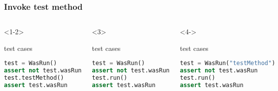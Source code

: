 \documentclass[lualatex]{beamer}
\begin{document}
\begin{frame}[fragile,t]
    \frametitle{Invoke test method}

    \begin{columns}[t]
        \small
        \begin{onlyenv}<1-2>
            \begin{block}{test cases}
                \begin{lstlisting}[language=Python,columns=fullflexible]
test = WasRun()
assert not test.wasRun
test.testMethod()
assert test.wasRun
                \end{lstlisting}
            \end{block}
        \end{onlyenv}

        \begin{onlyenv}<3>
            \begin{block}{test cases}
                \begin{lstlisting}[language=Python,columns=fullflexible]
test = WasRun()
assert not test.wasRun
test.run()
assert test.wasRun
                \end{lstlisting}
            \end{block}
        \end{onlyenv}

        \begin{onlyenv}<4->
            \begin{block}{test cases}
                \begin{lstlisting}[language=Python,columns=fullflexible]
test = WasRun("testMethod")
assert not test.wasRun
test.run()
assert test.wasRun
                \end{lstlisting}
            \end{block}
        \end{onlyenv}


\end{columns}
\end{frame}
\end{document}
